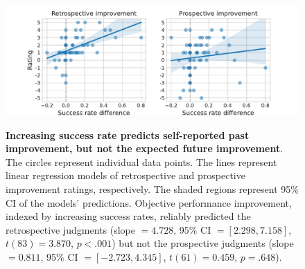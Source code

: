 \begin{figure}[tbh]
    \centering
    {\includegraphics[width=\linewidth]{Figures/c5/jolds_1_8_and_srd.pdf}}
    \caption[short figure description]{\textbf{Increasing success rate predicts self-reported past improvement, but not the expected future improvement}. The circles represent individual data points. The lines represent linear regression models of retrospective and prospective improvement ratings, respectively. The shaded regions represent 95\% CI of the models' predictions. Objective performance improvement, indexed by increasing success rates, reliably predicted the retrospective judgments (slope $=4.728$, 95\% CI $=[2.298, 7.158]$, $t(83) = 3.870$, $p<.001$) but not the prospective judgments (slope $=0.811$, 95\% CI $=[-2.723, 4.345]$, $t(61) = 0.459$, $p=.648$).}\label{fig:5-jolds_1_8_and_srd}
\end{figure}

